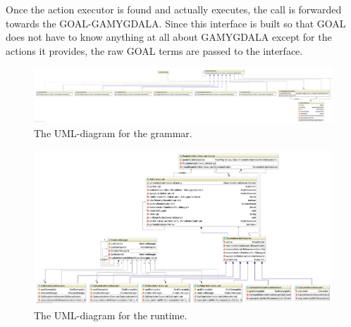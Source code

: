Once the action executor is found and actually executes, the call is forwarded towards the GOAL-GAMYGDALA. Since this interface is built so that GOAL does not have to know anything at all about GAMYGDALA except for the actions it provides, the raw GOAL terms are passed to the interface.

\begin{figure}
\includegraphics[width=\linewidth]{diagram-grammar}
\caption{The UML-diagram for the grammar.}
\end{figure}

\begin{figure}
\includegraphics[width=\linewidth]{diagram-runtime}
\caption{The UML-diagram for the runtime.}
\end{figure}